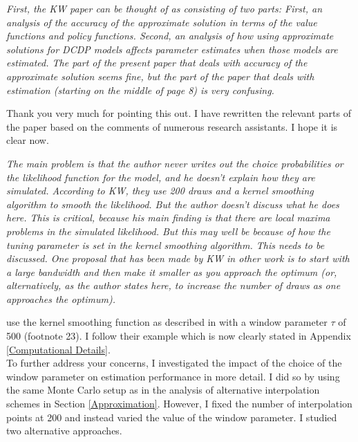 \begin{boenumerate}
\item \textit{First, the KW paper can be thought of as consisting of two parts: First, an analysis of the accuracy of the approximate solution in terms of the value functions and policy functions. Second, an analysis of how using approximate solutions for DCDP models affects parameter estimates when those models are estimated. The part of the present paper that deals with accuracy of the approximate solution seems fine, but the part of the paper that deals with estimation (starting on the middle of page 8) is very confusing.}\vspace{0.5cm}

Thank you very much for pointing this out. I have rewritten the relevant parts of the paper based on the comments of numerous research assistants. I hope it is clear now.
\item \textit{The main problem is that the author never writes out the choice probabilities or the likelihood function for the model, and he doesn't explain how they are simulated. According to KW, they use 200 draws and a kernel smoothing algorithm to smooth the likelihood. But the author doesn't discuss what he does here. This is critical, because his main finding is that there are local maxima problems in the simulated likelihood. But this may well be because of how the tuning parameter is set in the kernel smoothing algorithm. This needs to be discussed. One proposal that has been made by KW in other work is to start with a large bandwidth and then make it smaller as you approach the optimum (or, alternatively, as the author states here, to increase the number of draws as one approaches the optimum).}\vspace{0.5cm}

\cite{Keane.1994} use the kernel smoothing function as described in \citet{McFadden.1989} with a window parameter $\tau$ of 500 (footnote 23). I follow their example which is now clearly stated in Appendix \ref{Computational Details}.\\\newline
%
To further address your concerns, I investigated the impact of the choice of the window parameter on estimation performance in more detail. I did so by using the same Monte Carlo setup as in the analysis of alternative interpolation schemes in Section \ref{Approximation}. However, I fixed the number of interpolation points at 200 and instead varied the value of the window parameter. I studied two alternative approaches.


\end{boenumerate}
